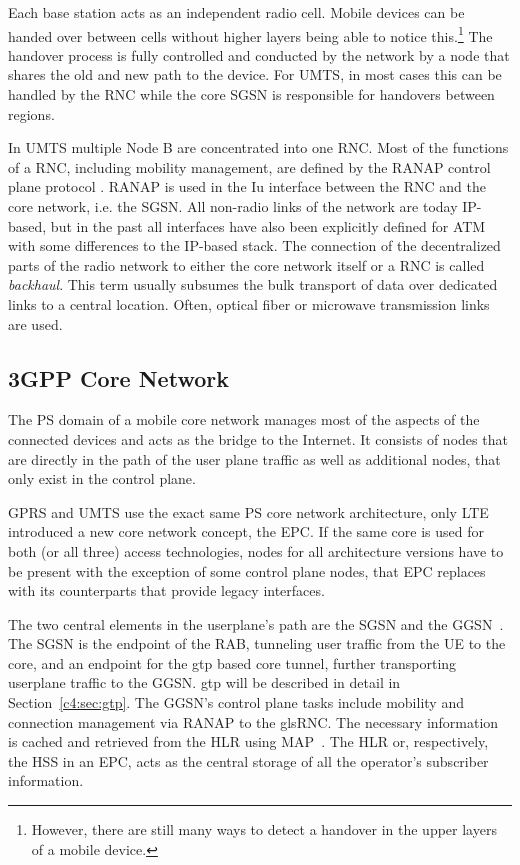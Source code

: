 Each base station acts as an independent radio cell. Mobile devices can be handed over between cells without higher layers being able to notice this.\footnote{However, there are still many ways to detect a handover in the upper layers of a mobile device.} The handover process is fully controlled and conducted by the network by a node that shares the old and new path to the device. For \gls{UMTS}, in most cases this can be handled by the \gls{RNC} while the core \gls{SGSN} is responsible for handovers between regions.

	
In \gls{UMTS} multiple Node B are concentrated into one \gls{RNC}. Most of the functions of a \gls{RNC}, including mobility management, are defined by the \gls{RANAP} control plane protocol \cite{3gpp.25.413}. \gls{RANAP} is used in the Iu interface between the \gls{RNC} and the core network, i.e. the \gls{SGSN}. All non-radio links of the network are today \gls{IP}-based, but in the past all interfaces have also been explicitly defined for \gls{ATM} with some differences to the \gls{IP}-based stack. The connection of the decentralized parts of the radio network to either the core network itself or a \gls{RNC} is called \textit{backhaul}. This term usually subsumes the bulk transport of data over dedicated links to a central location. Often, optical fiber or microwave transmission links are used.



\subsection{\texorpdfstring{\acrshort{3GPP}}{3GPP} Core Network}

The \gls{PS} domain of a mobile core network manages most of the aspects of the connected devices and acts as the bridge to the Internet. It consists of nodes that are directly in the path of the user plane traffic as well as additional nodes, that only exist in the control plane.

\gls{GPRS} and \gls{UMTS} use the exact same \gls{PS} core network architecture, only \gls{LTE} introduced a new core network concept, the \gls{EPC}. If the same core is used for both (or all three) access technologies, nodes for all architecture versions have to be present with the exception of some control plane nodes, that \gls{EPC} replaces with its counterparts that provide legacy interfaces.

The two central elements in the userplane's path are the \gls{SGSN} and the \gls{GGSN}~\cite{3gpp.22.060,3gpp.23.060}. The \gls{SGSN} is the endpoint of the \gls{RAB}, tunneling user traffic from the \gls{UE} to the core, and an endpoint for the \gls{gtp} based core tunnel, further transporting userplane traffic to the \gls{GGSN}. \gls{gtp} will be described in detail in Section~\ref{c4:sec:gtp}. The \gls{GGSN}'s control plane tasks include mobility and connection management via \gls{RANAP} to the gls{RNC}. The necessary information is cached and retrieved from the \gls{HLR}  using \gls{MAP}~\cite{3gpp.29.002}. The \gls{HLR} or, respectively, the \gls{HSS} in an \gls{EPC}, acts as the central storage of all the operator's subscriber information.

